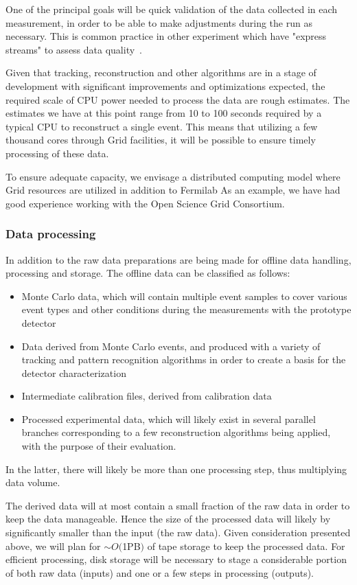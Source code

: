 One of the principal goals will be quick validation of the data collected in each measurement, in
order to be able to make adjustments during the run as necessary. 
This is common practice in other experiment which have "express streams" to assess data quality~\cite{atlas_express}.


Given that tracking, reconstruction and other algorithms are in a stage of development with significant improvements
and optimizations expected, the required scale of CPU power needed to process the data are rough estimates.
The estimates we have at this point range from 10 to 100 seconds required by a typical
CPU to reconstruct a single event. 
This means that utilizing a few thousand cores through Grid facilities, it will be possible to ensure timely processing of these data.

To ensure adequate capacity, we envisage a distributed computing model where Grid resources are utilized in addition to Fermilab
As an example, we have had good experience working with the Open Science Grid Consortium.


\subsubsection{Data processing}
\label{dataprocess}

In addition to the raw data preparations are being made for offline data handling, processing and storage.
The offline data can be classified as follows:
\begin{itemize}
\item Monte Carlo data, which will contain multiple event samples to cover various event types and other conditions during the measurements with the prototype detector
\item Data derived from Monte Carlo events, and produced with a variety of tracking and pattern recognition algorithms in order to create a basis for the detector characterization
\item Intermediate calibration files, derived from calibration data
\item Processed experimental data, which will likely exist in several parallel branches corresponding to a few reconstruction algorithms being applied, with the purpose of their evaluation.
\end{itemize}

In the latter, there will likely be more than one processing step, thus multiplying data volume. 

The derived data will at most contain a small fraction of the raw data in order to keep the data manageable.
Hence the size of the processed data will likely by significantly smaller than the input (the raw data). 
Given consideration presented above, we will plan for
$\sim$$ O($1PB$)$ of tape storage to keep the processed data. 
For efficient processing, disk storage will be necessary
to stage a considerable portion of both raw data (inputs) and one or a few steps in processing (outputs).

